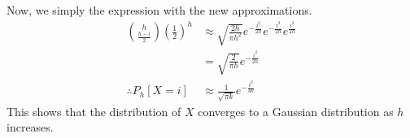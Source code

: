 Now, we simply the expression with the new approximations.
\begin{align*}
	\binom{h}{\frac{h-i}{2}}\left(\frac{1}{2}\right)^h & \approx \sqrt{\frac{2 h}{\pi h^2}}e^{-\frac{i^2}{2h}}e^{-\frac{i^2}{2h}}e^{\frac{i^2}{2h}} \\
	                                                   & = \sqrt{\frac{2}{\pi h}} e^{-\frac{i^2}{2h}}                                               \\
	\therefore P_h[X=i]                                & \approx \frac{1}{\sqrt{\pi k}} e^{-\frac{i^2}{4k}}
\end{align*}
This shows that the distribution of $X$ converges to a Gaussian distribution as $h$ increases.

